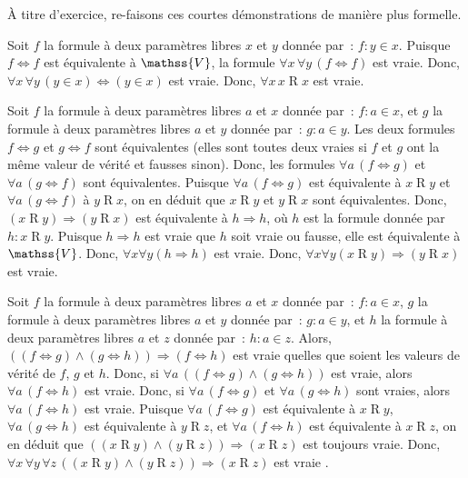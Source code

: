\noindent{} À titre d'exercice, re-faisons ces courtes démonstrations de manière plus formelle.
\startitemize[nowhite]
  \item Soit $f$ la formule à deux paramètres libres $x$ et $y$ donnée par : $f: y \in x$. 
      Puisque $f \Leftrightarrow f$ est équivalente à $\mathss{V}$, la formule $\forall x \, \forall y \, (f \Leftrightarrow f)$ est vraie. 
      Donc, $\forall x \, \forall y \, (y \in x) \Leftrightarrow (y \in x)$ est vraie.
      Donc, $\forall x \, x \mathrel{R} x$ est vraie.
  \item Soit $f$ la formule à deux paramètres libres $a$ et $x$ donnée par : $f: a \in x$, et $g$ la formule à deux paramètres libres $a$ et $y$ donnée par : $g: a \in y$. 
      Les deux formules $f \Leftrightarrow g$ et $g \Leftrightarrow f$ sont équivalentes (elles sont toutes deux vraies si $f$ et $g$ ont la même valeur de vérité et fausses sinon). 
      Donc, les formules $\forall a \, (f \Leftrightarrow g)$ et $\forall a \, (g \Leftrightarrow f)$ sont équivalentes. 
      Puisque $\forall a \, (f \Leftrightarrow g)$ est équivalente à $x \mathrel{R} y$ et $\forall a \, (g \Leftrightarrow f)$ à $y \mathrel{R} x$, on en déduit que $x \mathrel{R} y$ et $y \mathrel{R} x$ sont équivalentes. 
      Donc, $(x \mathrel{R} y) \Rightarrow (y \mathrel{R} x)$ est équivalente à $h \Rightarrow h$, où $h$ est la formule donnée par $h: x \mathrel{R} y$.
      Puisque $h \Rightarrow h$ est vraie que $h$ soit vraie ou fausse, elle est équivalente à $\mathss{V}$. 
      Donc, $\forall x \forall y (h \Rightarrow h)$ est vraie.
      Donc, $\forall x \forall y (x \mathrel{R} y) \Rightarrow (y \mathrel{R} x)$ est vraie.
  \item Soit $f$ la formule à deux paramètres libres $a$ et $x$ donnée par : $f: a \in x$, $g$ la formule à deux paramètres libres $a$ et $y$ donnée par : $g: a \in y$, et $h$ la formule à deux paramètres libres $a$ et $z$ donnée par : $h: a \in z$. 
      Alors, $((f \Leftrightarrow g) \wedge (g \Leftrightarrow h)) \Rightarrow (f \Leftrightarrow h)$ est vraie quelles que soient les valeurs de vérité de $f$, $g$ et $h$. 
      Donc, si $\forall a \, ((f \Leftrightarrow g) \wedge (g \Leftrightarrow h))$ est vraie, alors $\forall a \, (f \Leftrightarrow h)$ est vraie.
      Donc, si $\forall a \, (f \Leftrightarrow g)$ et $\forall a \, (g \Leftrightarrow h)$ sont vraies, alors $\forall a \, (f \Leftrightarrow h)$ est vraie.
      Puisque $\forall a \, (f \Leftrightarrow g)$ est équivalente à $x \mathrel{R} y$, $\forall a \, (g \Leftrightarrow h)$ est équivalente à $y \mathrel{R} z$, et $\forall a \, (f \Leftrightarrow h)$ est équivalente à $x \mathrel{R} z$, on en déduit que $((x \mathrel{R} y) \wedge (y \mathrel{R} z)) \Rightarrow (x \mathrel{R} z)$ est toujours vraie.
      Donc, $\forall x \, \forall y \, \forall z \, ((x \mathrel{R} y) \wedge (y \mathrel{R} z)) \Rightarrow (x \mathrel{R} z)$ est vraie .
\stopitemize

